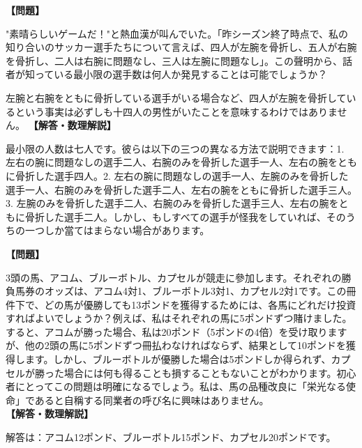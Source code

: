 \documentclass[10pt,a4paper,oneside,openany]{ltjsbook}
\begin{document}
\begin{tcolorbox}[colback=softblue,colframe=primaryblue,title=\textbf{第 389 問：サッカー選手たち （原題: THE FOOTBALL PLAYERS.）},arc=2mm,boxrule=1pt,breakable]
\textbf{【問題】}\par\vspace{0.3em}
"素晴らしいゲームだ！"と熱血漢が叫んでいた。「昨シーズン終了時点で、私の知り合いのサッカー選手たちについて言えば、四人が左腕を骨折し、五人が右腕を骨折し、二人は右腕に問題なし、三人は左腕に問題なし」。この聲明から、話者が知っている最小限の選手数は何人か発見することは可能でしょうか？

左腕と右腕をともに骨折している選手がいる場合など、四人が左腕を骨折しているという事実は必ずしも十四人の男性がいたことを意味するわけではありません。
\tcblower
\textbf{【解答・数理解説】}\par\vspace{0.3em}
最小限の人数は七人です。彼らは以下の三つの異なる方法で説明できます：1. 左右の腕に問題なしの選手二人、右腕のみを骨折した選手一人、左右の腕をともに骨折した選手四人。2. 左右の腕に問題なしの選手一人、左腕のみを骨折した選手一人、右腕のみを骨折した選手二人、左右の腕をともに骨折した選手三人。3. 左腕のみを骨折した選手二人、右腕のみを骨折した選手三人、左右の腕をともに骨折した選手二人。しかし、もしすべての選手が怪我をしていれば、そのうちの一つしか當てはまらない場合があります。
\end{tcolorbox}

\begin{tcolorbox}[colback=softblue,colframe=primaryblue,title=\textbf{第 390 問：馬レースのパズル （原題: THE HORSE-RACE PUZZLE.）},arc=2mm,boxrule=1pt,breakable]
\textbf{【問題】}\par\vspace{0.3em}
3頭の馬、アコム、ブルーボトル、カプセルが競走に參加します。それぞれの勝負馬券のオッズは、アコム4対1、ブルーボトル3対1、カプセル2対1です。この冊件下で、どの馬が優勝しても13ポンドを獲得するためには、各馬にどれだけ投資すればよいでしょうか？例えば、私はそれぞれの馬に5ポンドずつ賭けました。すると、アコムが勝った場合、私は20ポンド（5ポンドの4倍）を受け取りますが、他の2頭の馬に5ポンドずつ冊払わなければならず、結果として10ポンドを獲得します。しかし、ブルーボトルが優勝した場合は5ポンドしか得られず、カプセルが勝った場合には何も得ることも損することもないことがわかります。初心者にとってこの問題は明確になるでしょう。私は、馬の品種改良に「栄光なる使命」であると自稱する同業者の呼び名に興味はありません。
\tcblower
\textbf{【解答・数理解説】}\par\vspace{0.3em}
解答は：アコム12ポンド、ブルーボトル15ポンド、カプセル20ポンドです。
\end{tcolorbox}
\end{document}
